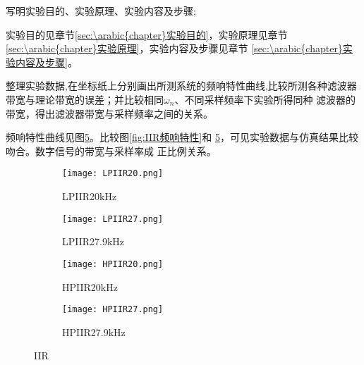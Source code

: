 \documentclass[../main]{subfiles}
\begin{document}
\begin{Exercise}

	写明实验目的、实验原理、实验内容及步骤;

\end{Exercise}

\begin{Answer}

	实验目的见章节\ref{sec:\arabic{chapter}实验目的}，实验原理见章节
	\ref{sec:\arabic{chapter}实验原理}，实验内容及步骤见章节
	\ref{sec:\arabic{chapter}实验内容及步骤}。

\end{Answer}

\begin{Exercise}

	整理实验数据,在坐标纸上分别画出所测系统的频响特性曲线,比较所测各种滤波器
	带宽与理论带宽的误差；并比较相同$ \omega_n $、不同采样频率下实验所得同种
	滤波器的带宽，得出滤波器带宽与采样频率之间的关系。

\end{Exercise}

\begin{Answer}

	频响特性曲线见图\ref{fig:IIR}。比较图\ref{fig:IIR频响特性}和
	\ref{fig:IIR}，可见实验数据与仿真结果比较吻合。数字信号的带宽与采样率成
	正比例关系。

\end{Answer}

\begin{figure}[htbp]
	\centering
	\begin{subfigure}[htbp]{.45\linewidth}
		\centering
		\texttt{[image: LPIIR20.png]}
		\caption{LPIIR20kHz}
		\label{fig:LPIIR20}
	\end{subfigure}
	\quad
	\begin{subfigure}[htbp]{.45\linewidth}
		\centering
		\texttt{[image: LPIIR27.png]}
		\caption{LPIIR27.9kHz}
		\label{fig:LPIIR27}
	\end{subfigure}

	\begin{subfigure}[htbp]{.45\linewidth}
		\centering
		\texttt{[image: HPIIR20.png]}
		\caption{HPIIR20kHz}
		\label{fig:HPIIR20}
	\end{subfigure}
	\quad
	\begin{subfigure}[htbp]{.45\linewidth}
		\centering
		\texttt{[image: HPIIR27.png]}
		\caption{HPIIR27.9kHz}
		\label{fig:HPIIR27}
	\end{subfigure}
	\caption{IIR}
	\label{fig:IIR}
\end{figure}
\end{document}
